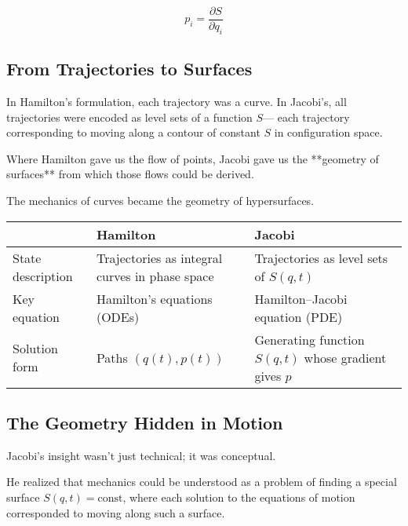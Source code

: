 \[
p_i = \frac{\partial S}{\partial q_i}
\]

\bigskip

\subsection*{From Trajectories to Surfaces}

In Hamilton’s formulation, each trajectory was a curve.  
In Jacobi’s, all trajectories were encoded as level sets of a function \( S \)—  
each trajectory corresponding to moving along a contour of constant \( S \) in configuration space.

Where Hamilton gave us the flow of points,  
Jacobi gave us the **geometry of surfaces** from which those flows could be derived.

The mechanics of curves became the geometry of hypersurfaces.

\bigskip

\begin{tcolorbox}[colback=gray!5!white, colframe=black, title=\textbf{Sidebar: The Shift from Hamilton to Jacobi}, fonttitle=\bfseries, arc=1.5mm, boxrule=0.4pt]

\begin{tabular}{>{\raggedright}p{4cm} >{\raggedright}p{5.5cm} >{\raggedright\arraybackslash}p{5.5cm}}
 & \textbf{Hamilton} & \textbf{Jacobi} \\
\midrule
State description & Trajectories as integral curves in phase space & Trajectories as level sets of \( S(q,t) \) \\
Key equation & Hamilton's equations (ODEs) & Hamilton–Jacobi equation (PDE) \\
Solution form & Paths \( (q(t), p(t)) \) & Generating function \( S(q,t) \) whose gradient gives \( p \)
\end{tabular}

\end{tcolorbox}

\bigskip

\subsection*{The Geometry Hidden in Motion}

Jacobi’s insight wasn’t just technical; it was conceptual.

He realized that mechanics could be understood as a problem of finding a special surface \( S(q,t) = \text{const} \),  
where each solution to the equations of motion corresponded to moving along such a surface.

